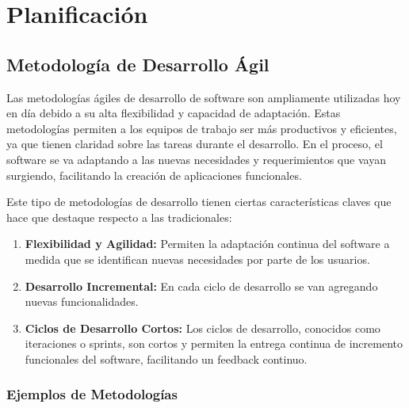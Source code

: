 \chapter{Planificación}
\section{Metodología de Desarrollo Ágil}

Las metodologías ágiles de desarrollo de software son ampliamente utilizadas hoy en día debido a su alta flexibilidad y capacidad de adaptación. Estas metodologías permiten a los equipos de trabajo ser más productivos y eficientes, ya que tienen claridad sobre las tareas durante el desarrollo. En el proceso, el software se va adaptando a las nuevas necesidades y requerimientos que vayan surgiendo, facilitando la creación de aplicaciones funcionales. \cite{santander}

Este tipo de metodologías de desarrollo tienen ciertas características claves que hace que destaque respecto a las tradicionales:

\begin{enumerate}
    \item \textbf{Flexibilidad y Agilidad:} Permiten la adaptación continua del software a medida que se identifican nuevas necesidades por parte de los usuarios.

    \item \textbf{Desarrollo Incremental:} En cada ciclo de desarrollo se van agregando nuevas funcionalidades.

    \item \textbf{Ciclos de Desarrollo Cortos:} Los ciclos de desarrollo, conocidos como iteraciones o sprints, son cortos y permiten la entrega continua de incremento funcionales del software, facilitando un feedback continuo.
\end{enumerate}

\subsection{Ejemplos de Metodologías}

